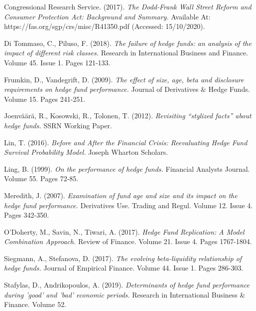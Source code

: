 \documentclass[11pt, english]{article}
\begin{document}
\begin{thebibliography}{9}

		Congressional Research Service. (2017).
		\textsl{The Dodd-Frank Wall Street Reform and Consumer Protection Act: Background and Summary.}
		Available At:
		https://fas.org/sgp/crs/misc/R41350.pdf
		(Accessed: 15/10/2020).

		Di Tommaso, C., Piluso, F. (2018).
		\textsl{The failure of hedge funds: an analysis of the impact of different risk classes.}
		Research in International Business and Finance. Volume 45. Issue 1. Pages 121-133.

                Frumkin, D., Vandegrift, D. (2009). 
                \textsl{The effect of size, age, beta and disclosure requirements on hedge fund performance.}
		Journal of Derivatives \& Hedge Funds. Volume 15. Pages 241-251.

                Joenv\"{a}\"{a}r\"{a}, R., Kosowski, R., Tolonen, T. (2012).
                \textsl{Revisiting ``stylized facts'' about hedge funds.}
		SSRN Working Paper.

                Lin, T. (2016). 
                \textsl{Before and After the Financial Crisis: Reevaluating Hedge Fund Survival Probability Model.}
		Joseph Wharton Scholars.

                Ling, B. (1999). 
                \textsl{On the performance of hedge funds.}
		Financial Analysts Journal. Volume 55. Pages 72-85.

                Meredith, J. (2007).
                \textsl{Examination of fund age and size and its impact on the hedge fund performance.}
		Derivatives Use. Trading and Regul. Volume 12. Issue 4. Pages 342-350.

                O'Doherty, M., Savin, N., Tiwari, A. (2017).
                \textsl{Hedge Fund Replication: A Model Combination Approach.}
		Review of Finance. Volume 21. Issue 4. Pages 1767-1804.

                Siegmann, A., Stefanova, D. (2017). 
                \textsl{The evolving beta-liquidity relationship of hedge funds.}
		Journal of Empirical Finance. Volume 44. Issue 1. Pages 286-303.

                Stafylas, D., Andrikopoulos, A. (2019).
                \textsl{Determinants of hedge fund performance during 'good' and 'bad' economic periods.}
		Research in International Business \& Finance. Volume 52.


\end{thebibliography}
\end{document}
